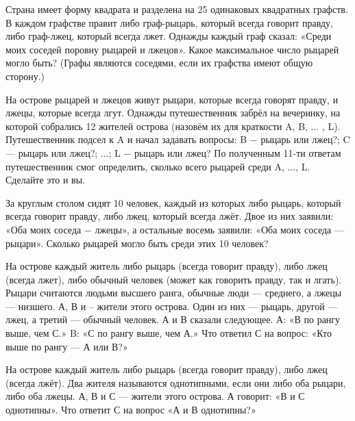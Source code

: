  Страна имеет форму квадрата и разделена на 25 одинаковых квадратных графств. В каждом графстве правит либо граф-рыцарь, который всегда говорит правду, либо граф-лжец, который всегда лжет. Однажды каждый граф сказал: «Среди моих соседей поровну рыцарей и лжецов». Какое максимальное число рыцарей могло быть? (Графы являются соседями, если их графства имеют общую сторону.)

 На острове рыцарей и лжецов живут рыцари, которые всегда говорят правду, и лжецы, которые всегда лгут. Однажды путешественник забрёл на вечеринку, на которой собрались 12 жителей острова (назовём их для краткости A, B, $\dotsc$ , L). Путешественник подсел к A и начал задавать вопросы: B $-$ рыцарь или лжец?; C — рыцарь или лжец?; $\dotsc$; L $-$ рыцарь или лжец? По полученным 11-ти ответам путешественник смог определить, сколько всего рыцарей среди A, $\dotsc$, L. Сделайте это и вы.

 За круглым столом сидят 10 человек, каждый из которых либо рыцарь, который всегда говорит правду, либо лжец, который всегда лжёт. Двое из них заявили: «Оба моих соседа $-$ лжецы», а остальные восемь заявили: «Оба моих соседа — рыцари». Сколько рыцарей могло быть среди этих 10 человек?

 На острове каждый житель либо рыцарь (всегда говорит правду), либо лжец (всегда лжет), либо обычный человек (может как говорить правду, так и лгать). Рыцари считаются людьми высшего ранга, обычные люди — среднего, а лжецы — низшего. А, В и – жители этого острова. Один из них — рыцарь, другой — лжец, а третий — обычный человек. А и В сказали следующее. А:
«В по рангу выше, чем С.» B: «С по рангу выше, чем А.» Что ответил С на вопрос: «Кто выше по рангу — А или В?»

 На острове каждый житель либо рыцарь (всегда говорит правду), либо
лжец (всегда лжёт). Два жителя называются однотипными, если они либо оба рыцари, либо
оба лжецы. А, В и С — жители этого острова. А говорит: «В и С однотипны». Что ответит С на вопрос «А и В однотипны?»